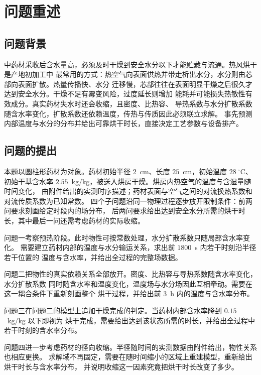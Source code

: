 \section{问题重述}

\subsection{问题背景}

中药材采收后含水量高，必须及时干燥到安全水分以下才能贮藏与流通。热风烘干是产地初加工中
最常用的方式：热空气向表面供热并带走析出水分，水分则由芯部向表面扩散。热量传播快、水分
迁移慢，芯部往往在表面明显干燥之后很久才达到安全水分。干燥不足有霉变风险，过度延长则增加
能耗并可能损失热敏性有效成分。真实药材失水时还会收缩，且密度、比热容、
导热系数与水分扩散系数随含水率变化，扩散系数还依赖温度，传热与传质因此必须联立求解。
事先预测内部温度与水分的分布并给出可靠烘干时长，直接决定工艺参数与设备排产。

\subsection{问题的提出}

本题以圆柱形药材为对象。药材初始半径 $2$~cm、长度 $25$~cm，初始温度 $28~^\circ$C、
初始干基含水率 $2.55$~kg/kg，被送入烘房干燥。烘房内热空气的温度与含湿量随时间变化，
由附件给出的实测时序描述；药材表面与空气之间的对流换热系数和对流传质系数为已知常数。
四个子问题沿同一物理过程逐步放开限制条件：前两问要求刻画给定时段内的场分布，
后两问要求给出达到安全水分所需的烘干时长，其中最后一问还需考虑药材的实际收缩。

问题一考察预热阶段。此时物性可按常数处理，水分扩散系数只随局部含水率变化。
需要建立药材内部的温度与水分输运关系，求出前 $1800$~s 内若干时刻沿半径若干位置的
温度与含水率，并给出全过程的完整场数据。

问题二把物性的真实依赖关系全部放开。密度、比热容与导热系数随含水率变化，水分扩散系数
同时随含水率和温度变化，温度场与水分场因此互相牵动。需要在这一耦合条件下重新刻画整个
烘干过程，并给出前 $3$~h 内的温度与含水率分布。

问题三在问题二的模型上追加干燥完成的判定。当药材内部含水率降到 $0.15$~kg/kg 以下即视为
烘干完成，需要给出达到该状态所需的时长，并给出全过程中若干时刻的含水率分布。

问题四进一步考虑药材的径向收缩。半径随时间的实测数据由附件给出，物性关系也相应更换。
求解域不再固定，需要在随时间缩小的区域上重建模型，重新给出烘干时长与含水率分布，
并说明收缩这一因素究竟把烘干时长改变了多少。
